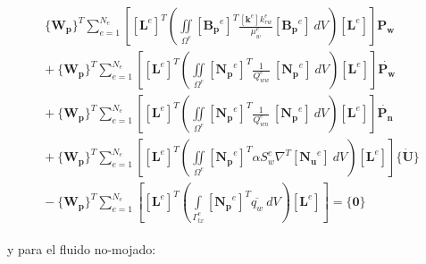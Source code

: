 \begin{ceqn} 
\begin{gather}\label{eq:equ3103}
\begin{multlined}
 \{\mathbf{W_p}\}^T  \displaystyle\sum_{e=1}^{N_e} \left[ \left[\mathbf{L}^e\right]^T \left( \iint \limits_{\Omega^e}  [\mathbf{B_p}^e]^T \frac{[\mathbf{k}^e] k_{rw}^e}{\mu_w^e} [\mathbf{B_p}^e]\ dV \right) \left[\mathbf{L}^e\right] \right] \mathbf{P_w}\\[10pt]
+\ \{\mathbf{W_p}\}^T \displaystyle\sum_{e=1}^{N_e} \left[ \left[\mathbf{L}^e\right]^T \left( \iint \limits_{\Omega^e}  [\mathbf{N_p}^e]^T \frac{1}{Q_{ww}^e}\ [\mathbf{N_p}^e]\ dV \right) \left[\mathbf{L}^e\right] \right] \mathbf{\dot{P_w}} \\[10pt]
+\ \{\mathbf{W_p}\}^T \displaystyle\sum_{e=1}^{N_e} \left[ \left[\mathbf{L}^e\right]^T \left( \iint \limits_{\Omega^e}  [\mathbf{N_p}^e]^T \frac{1}{Q_{wn}^e}\ [\mathbf{N_p}^e]\ dV \right) \left[\mathbf{L}^e\right] \right] \mathbf{\dot{P_n}} \\[10pt]
+\ \{\mathbf{W_p}\}^T \displaystyle\sum_{e=1}^{N_e} \left[ \left[\mathbf{L}^e\right]^T \left( \iint \limits_{\Omega^e}  [\mathbf{N_p}^e]^T  \alpha S_w^e \nabla^T [\mathbf{N_u}^e]\ dV \right) \left[\mathbf{L}^e\right] \right]\{\mathbf{\dot{U}}\}  \\[10pt]
-\ \{\mathbf{W_p}\}^T \displaystyle\sum_{e=1}^{N_e} \left[ \left[\mathbf{L}^e\right]^T \left(  \int \limits_{\Gamma^e_{tx}} [\mathbf{N_p}^e]^T \overline{q_w}\ dV \right) \left[\mathbf{L}^e\right] \right] = \{\mathbf{0}\}
\end{multlined}
\end{gather}  
\end{ceqn}

y para el fluido no-mojado:

